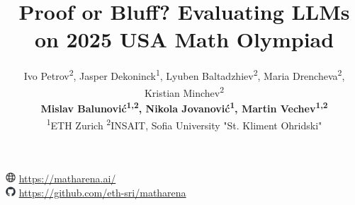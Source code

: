 \documentclass{article}
\title{Proof or Bluff? Evaluating LLMs on 2025 USA Math Olympiad}
\author{Ivo Petrov\textsuperscript{2},
	Jasper Dekoninck\textsuperscript{1},
	Lyuben Baltadzhiev\textsuperscript{2},
	Maria Drencheva\textsuperscript{2},
	Kristian Minchev\textsuperscript{2}\\
	\textbf{
    Mislav Balunović\textsuperscript{1,2}, 
    Nikola Jovanović\textsuperscript{1}, 
    Martin Vechev\textsuperscript{1,2}}\\
    \hspace{4.2em} \textsuperscript{1}ETH Zurich \hspace{4em} \textsuperscript{2}INSAIT, Sofia University "St. Kliment Ohridski"
}
\begin{document}
\maketitle
\vspace{-3em}
\begin{center}
	\includegraphics[height=1em]{figures/website-icon.png} \url{https://matharena.ai/}\\
    \includegraphics[height=1em]{figures/github-icon.png} \url{https://github.com/eth-sri/matharena}
\end{center}
























\end{document}
